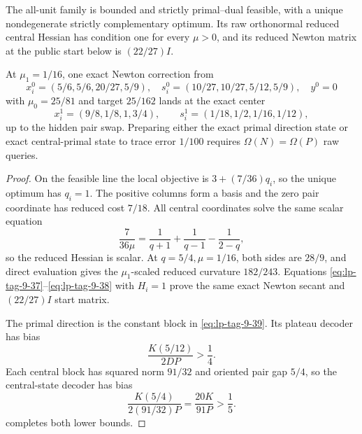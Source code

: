 \begin{theorem}
\label{thm:lp-bounded-exact}
The all-unit family is bounded and strictly primal--dual feasible, with a
unique nondegenerate strictly complementary optimum.  Its raw orthonormal
reduced central Hessian has condition one for every \(\mu>0\), and its
reduced Newton matrix at the public start below is \((22/27)I\).

At \(\mu_1=1/16\), one exact Newton correction from
\begin{equation}
 x_i^0=(5/6,5/6,20/27,5/9),\quad
 s_i^0=(10/27,10/27,5/12,5/9),\quad y^0=0
\label{eq:lp-tag-9-77}
\end{equation}
with \(\mu_0=25/81\) and target \(25/162\) lands at the exact center
\begin{equation}
 x_i^1=(9/8,1/8,1,3/4),\qquad
 s_i^1=(1/18,1/2,1/16,1/12),
\end{equation}
up to the hidden pair swap.  Preparing either the exact primal direction
state or exact central-primal state to trace error \(1/100\) requires
\(\Omega(N)=\Omega(P)\) raw queries.
\end{theorem}

\begin{proof}
On the feasible line the local objective is \(3+(7/36)q_i\), so the unique
optimum has \(q_i=1\).  The positive columns form a basis and the zero pair
coordinate has reduced cost \(7/18\).  All central coordinates solve the
same scalar equation
\[
 \frac{7}{36\mu}=\frac1{q+1}+\frac1{q-1}-\frac1{2-q},
\]
so the reduced Hessian is scalar.  At \(q=5/4,\mu=1/16\), both sides are
\(28/9\), and direct evaluation gives the \(\mu_1\)-scaled reduced
curvature \(182/243\).  Equations
\eqref{eq:lp-tag-9-37}--\eqref{eq:lp-tag-9-38} with \(H_i=1\) prove the same exact Newton secant and
\((22/27)I\) start matrix.

The primal direction is the constant block in \eqref{eq:lp-tag-9-39}.  Its plateau decoder
has bias
\[
 \frac{K(5/12)}{2DP}>\frac14.
\]
Each central block has squared norm \(91/32\) and oriented pair gap \(5/4\),
so the central-state decoder has bias
\[
 \frac{K(5/4)}{2(91/32)P}=\frac{20K}{91P}>\frac15.
\]
 completes both lower bounds.
\end{proof}

